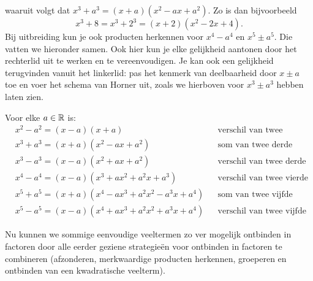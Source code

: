 \documentclass{ximera}
\begin{document}
waaruit volgt dat  $x^3 + a^3 = (x+a)(x^2-ax+a^2)$. Zo is dan bijvoorbeeld
\[
x^3+8 = x^3 + 2^3 = (x+2)(x^2-2x+4).
\]
Bij uitbreiding kun je ook producten herkennen voor $x^4-a^4$ en $x^5 \pm a^5$. Die vatten we hieronder samen. Ook hier kun je elke gelijkheid aantonen door het rechterlid uit te werken en te vereenvoudigen. Je kan ook een gelijkheid terugvinden vanuit het linkerlid: pas het kenmerk van deelbaarheid door $x \pm a$ toe en voer het schema van Horner uit, zoals we hierboven voor $x^3 \pm a^3$ hebben laten zien.
	
\begin{proposition} 
Voor elke $a \in \mathbb{R}$ is:
\begin{align*}
& x^2 - a^2 = (x-a)(x+a) && \text{verschil van twee kwadraten} \\
& x^3 + a^3 = (x+a)(x^2 - ax + a^2) && \text{som van twee derde machten} \\
& x^3 - a^3 = (x-a)(x^2 + ax + a^2) && \text{verschil van twee derde machten} \\
& x^4 - a^4 = (x-a)(x^3 + ax^2 + a^2x + a^3) && \text{verschil van twee vierde machten} \\
& x^5 + a^5 = (x+a)(x^4 - ax^3 + a^2x^2 - a^3x + a^4) && \text{som van twee vijfde machten} \\
& x^5 - a^5 = (x-a)(x^4 + ax^3 + a^2x^2 + a^3x + a^4) && \text{verschil van twee vijfde machten.}
\end{align*}
\end{proposition} 



Nu kunnen we sommige eenvoudige veeltermen zo ver mogelijk ontbinden in factoren door alle eerder geziene strategieën voor ontbinden in factoren te combineren (afzonderen, merkwaardige producten herkennen, groeperen en ontbinden van een kwadratische veelterm).
\end{document}
